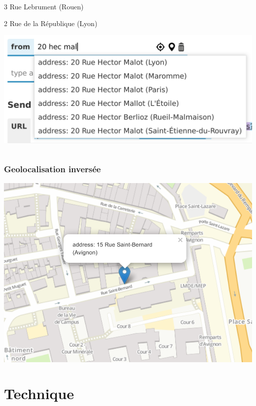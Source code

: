 \documentclass[table]{beamer}
\begin{document}
\begin{frame}
\begin{columns}
\begin{column}{.5\linewidth}
\begin{block}{\strut 3 Rue Lebrument (Rouen)}
      \end{block}
      \begin{block}{\strut 2 Rue de la République (Lyon)}
        \includegraphics[width=\textwidth]{images/autocomplete-20-hec-mal-lyon}
      \end{block}
    \end{column}
  \end{columns}
\end{frame}

\begin{frame}
  \frametitle{Geolocalisation inversée}

  \centering
  \includegraphics[width=.8\linewidth]{images/reverse-geocoding}
\end{frame}

\section{Technique}
\end{document}
